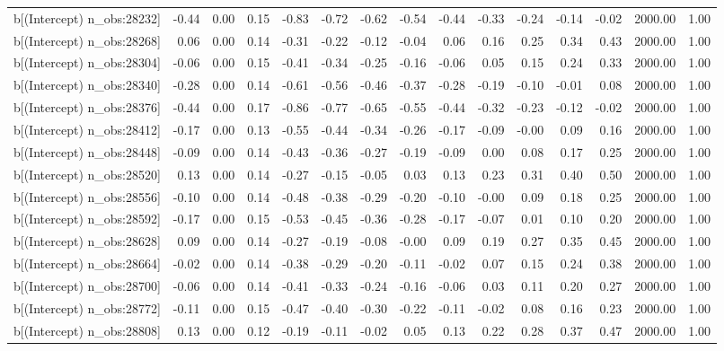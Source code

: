 \begin{table}[ht]
\begin{tabular}{rrrrrrrrrrrrrrr}
  b[(Intercept) n\_obs:28232] & -0.44 & 0.00 & 0.15 & -0.83 & -0.72 & -0.62 & -0.54 & -0.44 & -0.33 & -0.24 & -0.14 & -0.02 & 2000.00 & 1.00 \\ 
  b[(Intercept) n\_obs:28268] & 0.06 & 0.00 & 0.14 & -0.31 & -0.22 & -0.12 & -0.04 & 0.06 & 0.16 & 0.25 & 0.34 & 0.43 & 2000.00 & 1.00 \\ 
  b[(Intercept) n\_obs:28304] & -0.06 & 0.00 & 0.15 & -0.41 & -0.34 & -0.25 & -0.16 & -0.06 & 0.05 & 0.15 & 0.24 & 0.33 & 2000.00 & 1.00 \\ 
  b[(Intercept) n\_obs:28340] & -0.28 & 0.00 & 0.14 & -0.61 & -0.56 & -0.46 & -0.37 & -0.28 & -0.19 & -0.10 & -0.01 & 0.08 & 2000.00 & 1.00 \\ 
  b[(Intercept) n\_obs:28376] & -0.44 & 0.00 & 0.17 & -0.86 & -0.77 & -0.65 & -0.55 & -0.44 & -0.32 & -0.23 & -0.12 & -0.02 & 2000.00 & 1.00 \\ 
  b[(Intercept) n\_obs:28412] & -0.17 & 0.00 & 0.13 & -0.55 & -0.44 & -0.34 & -0.26 & -0.17 & -0.09 & -0.00 & 0.09 & 0.16 & 2000.00 & 1.00 \\ 
  b[(Intercept) n\_obs:28448] & -0.09 & 0.00 & 0.14 & -0.43 & -0.36 & -0.27 & -0.19 & -0.09 & 0.00 & 0.08 & 0.17 & 0.25 & 2000.00 & 1.00 \\ 
  b[(Intercept) n\_obs:28520] & 0.13 & 0.00 & 0.14 & -0.27 & -0.15 & -0.05 & 0.03 & 0.13 & 0.23 & 0.31 & 0.40 & 0.50 & 2000.00 & 1.00 \\ 
  b[(Intercept) n\_obs:28556] & -0.10 & 0.00 & 0.14 & -0.48 & -0.38 & -0.29 & -0.20 & -0.10 & -0.00 & 0.09 & 0.18 & 0.25 & 2000.00 & 1.00 \\ 
  b[(Intercept) n\_obs:28592] & -0.17 & 0.00 & 0.15 & -0.53 & -0.45 & -0.36 & -0.28 & -0.17 & -0.07 & 0.01 & 0.10 & 0.20 & 2000.00 & 1.00 \\ 
  b[(Intercept) n\_obs:28628] & 0.09 & 0.00 & 0.14 & -0.27 & -0.19 & -0.08 & -0.00 & 0.09 & 0.19 & 0.27 & 0.35 & 0.45 & 2000.00 & 1.00 \\ 
  b[(Intercept) n\_obs:28664] & -0.02 & 0.00 & 0.14 & -0.38 & -0.29 & -0.20 & -0.11 & -0.02 & 0.07 & 0.15 & 0.24 & 0.38 & 2000.00 & 1.00 \\ 
  b[(Intercept) n\_obs:28700] & -0.06 & 0.00 & 0.14 & -0.41 & -0.33 & -0.24 & -0.16 & -0.06 & 0.03 & 0.11 & 0.20 & 0.27 & 2000.00 & 1.00 \\ 
  b[(Intercept) n\_obs:28772] & -0.11 & 0.00 & 0.15 & -0.47 & -0.40 & -0.30 & -0.22 & -0.11 & -0.02 & 0.08 & 0.16 & 0.23 & 2000.00 & 1.00 \\ 
  b[(Intercept) n\_obs:28808] & 0.13 & 0.00 & 0.12 & -0.19 & -0.11 & -0.02 & 0.05 & 0.13 & 0.22 & 0.28 & 0.37 & 0.47 & 2000.00 & 1.00 \\ 

\end{tabular}
\end{table}
